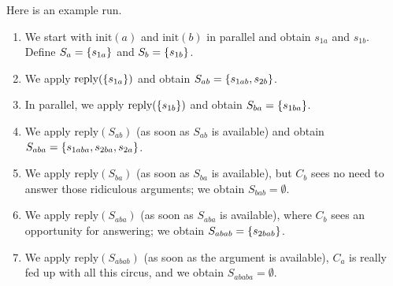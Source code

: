 \documentclass[version=3.21, pagesize, twoside=off, bibliography=totoc, DIV=calc, fontsize=12pt, a4paper]{scrartcl}
\begin{document}
\begin{example}
Here is an example run.
\begin{enumerate}
	\item We start with $\text{init}(a)$ and $\text{init}(b)$ in parallel and obtain $s_{1a}$ and $s_{1b}$. Define $S_{a} = \{s_{1a}\}$ and $S_{b} = \{s_{1b}\}$.
	\item We apply $\text{reply}(\{s_{1a}\})$ and obtain $S_{ab} = \{s_{1ab}, s_{2b}\}$.
	\item In parallel, we apply $\text{reply}(\{s_{1b}\})$ and obtain $S_{ba} = \{s_{1ba}\}$.
	\item We apply $\text{reply}(S_{ab})$ (as soon as $S_{ab}$ is available) and obtain $S_{aba} = \{s_{1aba}, s_{2ba}, s_{2a}\}$.
	\item We apply $\text{reply}(S_{ba})$ (as soon as $S_{ba}$ is available), but $C_b$ sees no need to answer those ridiculous arguments; we obtain $S_{bab} = \emptyset$.
	\item We apply $\text{reply}(S_{aba})$ (as soon as $S_{aba}$ is available), where $C_b$ sees an opportunity for answering; we obtain $S_{abab} = \{s_{2bab}\}$.
	\item We apply $\text{reply}(S_{abab})$ (as soon as the argument is available), $C_a$ is really fed up with all this circus, and we obtain $S_{ababa} = \emptyset$.
\end{enumerate}
\end{example}
\end{document}
